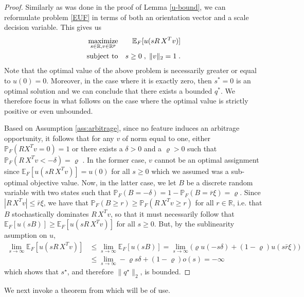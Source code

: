 \documentclass[]{interact}
\theoremstyle{plain}%
\theoremstyle{definition}
\theoremstyle{remark}
\def\Expect{{\mathbb E}}
\def\Prob{{\mathbb P}}
\def\maximize{\mathop{\rm maximize}}
\def\subto{{\rm subject \mbox{   }\rm to}}
\newcommand{\0}{\V{0}}
\newcommand{\1}{\V{1}}
\renewcommand{\Re}{\mathbb{R}}
\theoremstyle{plain}
\theoremstyle{definition}
\begin{document}
\begin{proof}
Similarly as was done in the proof of Lemma \ref{u-bound}, we can reformulate problem \eqref{EUF} in terms of both  an orientation vector and a scale decision variable. This gives us
  \begin{eqnarray*}
    \maximize_{s\in\Re,v\in\Re^p} && \Expect_F[ u(s R\,X^T v)] \\
    \subto&& s\geq0\;,\;\|v\|_2=1\;.
  \end{eqnarray*}
Note that the optimal value of the above problem is necessarily greater or equal to $u(0)=0$. Moreover, in the case where it is exactly zero, then $s^*=0$ is an optimal solution and we can conclude that there exists a bounded $q^*$. We therefore focus in what follows on the case where the optimal value is strictly positive or even unbounded.

Based on Assumption \ref{ass:arbitrage}, since no feature induces an arbitrage opportunity, it follows that
for any $v$ of norm equal to one, either $\Prob_F(RX^Tv=0)=1$ or there exists a $\delta>0$ and a $\varrho>0$ such that $\Prob_F(R\,X^T v<-\delta)=\varrho$ . In the former case, $v$ cannot be an optimal assignment since $\Expect_F[ u(s R\,X^T v)] = u(0)$ for all $s\geq 0$ which we assumed was a sub-optimal objective value.  Now, in the latter case,
we let $B$ be a discrete random variable with two states such that
$\Prob_F(B=-\delta)=1-\Prob_F(B=\bar r\xi)=\varrho$. Since $|R\,X^T v|\leq \bar r\xi$, we have
that $\Prob_F(B\geq r) \geq \Prob_F(R\,X^T v\geq r)$ for all $r\in\Re$, i.e. that $B$ stochastically dominates $R\,X^T v$, so that 
it must necessarily follow that $\Expect_F[u(sB)]\geq \Expect_F[u(sR\,X^T v)]$ for all $s\geq 0$. But, by the sublinearity asumption on
$u$,
\begin{align*}
  \lim_{s\to\infty}\Expect_F[u(sR\,X^T v)] &\leq   \lim_{s\to\infty}\Expect_F[u(sB)]  = \lim_{s\to\infty}\big(\varrho  u(-s\delta)+(1-\varrho)u(s\bar r\xi)\big) \\
  &\leq   \lim_{s\to\infty} -\varrho s\delta + (1-\varrho) o(s) =  -\infty\;
 \end{align*} 
which shows that
$s^\star$, and therefore $\|q^\star\|_2$, is bounded.
\end{proof}

We next invoke a theorem from \cite{sridharan2009fast} which will be of use.
\end{document}
